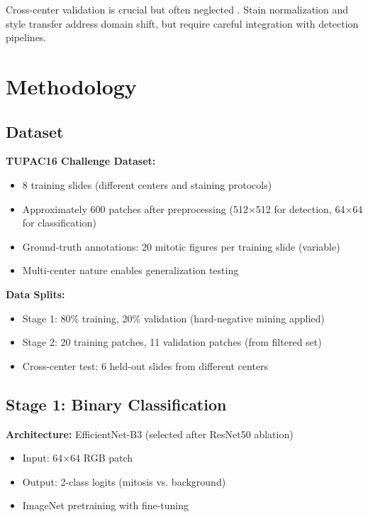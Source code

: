 \documentclass[11pt,a4paper]{article}
\begin{document}
Cross-center validation is crucial but often neglected \cite{Gadermayr2017}. 
Stain normalization \cite{Macenko2009,Reinhard2001} and style transfer 
\cite{Li2018} address domain shift, but require careful integration with 
detection pipelines.

\section{Methodology}

\subsection{Dataset}

\textbf{TUPAC16 Challenge Dataset:}
\begin{itemize}
    \item 8 training slides (different centers and staining protocols)
    \item Approximately 600 patches after preprocessing (512×512 for detection, 
          64×64 for classification)
    \item Ground-truth annotations: 20 mitotic figures per training slide (variable)
    \item Multi-center nature enables generalization testing
\end{itemize}

\textbf{Data Splits:}
\begin{itemize}
    \item Stage 1: 80\% training, 20\% validation (hard-negative mining applied)
    \item Stage 2: 20 training patches, 11 validation patches (from filtered set)
    \item Cross-center test: 6 held-out slides from different centers
\end{itemize}

\subsection{Stage 1: Binary Classification}

\textbf{Architecture:} EfficientNet-B3 (selected after ResNet50 ablation)
\begin{itemize}
    \item Input: 64×64 RGB patch
    \item Output: 2-class logits (mitosis vs. background)
    \item ImageNet pretraining with fine-tuning
\end{itemize}
\end{document}
